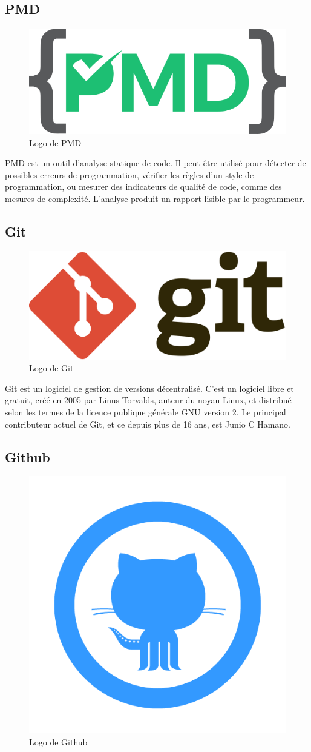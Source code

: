 \subsection{PMD}

\begin{figure}[H]
    \centering
    \includegraphics[width=.35\textwidth]{logos/pmd.png}
    \caption{Logo de PMD}
\end{figure}

\noindent PMD est un outil d'analyse statique de code. Il peut être utilisé pour détecter de possibles erreurs de programmation, vérifier les règles d'un style de programmation, ou mesurer des indicateurs de qualité de code, comme des mesures de complexité. L'analyse produit un rapport lisible par le programmeur. 

\clearpage

\subsection{Git}

\begin{figure}[H]
    \centering
    \includegraphics[width=.3\textwidth]{logos/git.png}
    \caption{Logo de Git}
\end{figure}

\noindent Git est un logiciel de gestion de versions décentralisé. C'est un logiciel libre et gratuit, créé en 2005 par Linus Torvalds, auteur du noyau Linux, et distribué selon les termes de la licence publique générale GNU version 2. Le principal contributeur actuel de Git, et ce depuis plus de 16 ans, est Junio C Hamano. 

\subsection{Github}

\begin{figure}[H]
    \centering
    \includegraphics[width=.25\textwidth]{logos/github.png}
    \caption{Logo de Github}
\end{figure}

